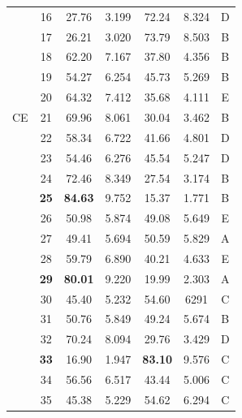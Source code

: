 \documentclass[12pt]{article}
\begin{document}
\begin{table}[htbp]
\begin{tabular}{c|c|c|c|c|c|c}
               & 16          & 27.76               &  3.199    & 72.24            & 8.324    &  D    \\
               & 17          & 26.21               &  3.020    &  73.79           & 8.503    &  B    \\
               & 18          & 62.20               &  7.167    &  37.80           & 4.356    &  B    \\
               & 19          & 54.27               &  6.254    &  45.73           & 5.269    &  B    \\
               & 20          & 64.32               &  7.412    &  35.68           & 4.111    &  E    \\
CE    
               & 21          &  69.96              &  8.061    &  30.04           &  3.462   &  B    \\
               & 22          &  58.34              &  6.722    &  41.66           &  4.801   &  D    \\
               & 23          &  54.46              &  6.276    &  45.54           &  5.247   &  D    \\          
               & 24          &  72.46              &  8.349    &  27.54           &  3.174   &  B    \\
               & \textbf{25} & \textbf{84.63}      &  9.752    &  15.37           &  1.771   &  B    \\
               & 26          &  50.98              &  5.874    &  49.08           &  5.649   &  E    \\              
               & 27          &  49.41              &  5.694    &  50.59           & 5.829    &  A    \\
               & 28          &  59.79              &  6.890    &  40.21           & 4.633    &  E    \\
               & \textbf{29} &  \textbf{80.01}     &  9.220    &  19.99           &  2.303   &  A    \\
               & 30          &  45.40              &  5.232    &  54.60           &  6291    &  C    \\
               & 31          &  50.76              &  5.849    &  49.24           &  5.674   &  B    \\
               & 32          &  70.24              &  8.094    &  29.76           &  3.429   &  D    \\
               & \textbf{33} &  16.90              &  1.947    &  \textbf{83.10}  &   9.576  &  C    \\
               & 34          &  56.56              &  6.517    &  43.44           &   5.006  &  C    \\
               & 35          &  45.38              &  5.229    &  54.62           &   6.294  &  C    \\
\hline\hline
\end{tabular}
\end{table}
\vskip0.3cm
\end{document}
